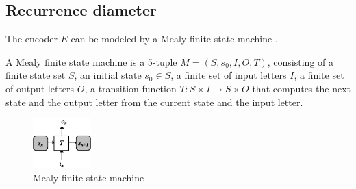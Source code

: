 \documentclass[journal]{IEEEtran}
\begin{document}
%




\subsection{Recurrence diameter}\label{subsec_recdia}

The encoder $E$ can be modeled by a Mealy finite state machine \cite{MEALY}.

\begin{definition11}\label{MealyFSM}%
A Mealy finite state machine is a 5-tuple $M=(S,s_0,I,O,T)$,
consisting of a finite state set $S$,
an initial state $s_0\in S$,
a finite set of input letters $I$,
a finite set of output letters $O$,
a transition function $T: S\times I\to S\times O$ that computes the next state and the output letter from the current state and the input letter.
\end{definition11}
\begin{figure}[t]
\begin{center}
\includegraphics[width=0.20\textwidth]{mealy}
\end{center}
\caption{Mealy finite state machine}
  \label{mealy}
\end{figure}
\end{document}
